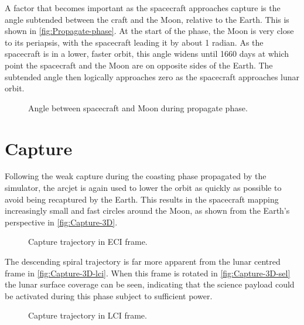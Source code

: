 A factor that becomes important as the spacecraft approaches capture is the angle subtended between the craft and the Moon, relative to the Earth. This is shown in \autoref{fig:Propagate-phase}. At the start of the phase, the Moon is very close to its periapsis, with the spacecraft leading it by about 1 radian. As the spacecraft is in a lower, faster orbit, this angle widens until 1660 days at which point the spacecraft and the Moon are on opposite sides of the Earth. The subtended angle then logically approaches zero as the spacecraft approaches lunar orbit.

\begin{figure}
\centering
\def\svgwidth{\figurewidth}

\caption{Angle between spacecraft and Moon during propagate phase.}
\label{fig:Propagate-phase}
\end{figure}


\clearpage

\section{Capture} \label{sec:Capture}

Following the weak capture during the coasting phase propagated by the simulator, the arcjet is again used to lower the orbit as quickly as possible to avoid being recaptured by the Earth. This results in the spacecraft mapping increasingly small and fast circles around the Moon, as shown from the Earth's perspective in \autoref{fig:Capture-3D}.

\begin{figure}
\centering
\def\svgwidth{\figurewidth}

\caption{Capture trajectory in ECI frame.}
\label{fig:Capture-3D}
\end{figure}

The descending spiral trajectory is far more apparent from the lunar centred frame in \autoref{fig:Capture-3D-lci}. When this frame is rotated in \autoref{fig:Capture-3D-sel} the lunar surface coverage can be seen, indicating that the science payload could be activated during this phase subject to sufficient power.

\begin{figure}
\centering
\def\svgwidth{\figurewidth}

\caption{Capture trajectory in LCI frame.}
\label{fig:Capture-3D-lci}
\end{figure}

